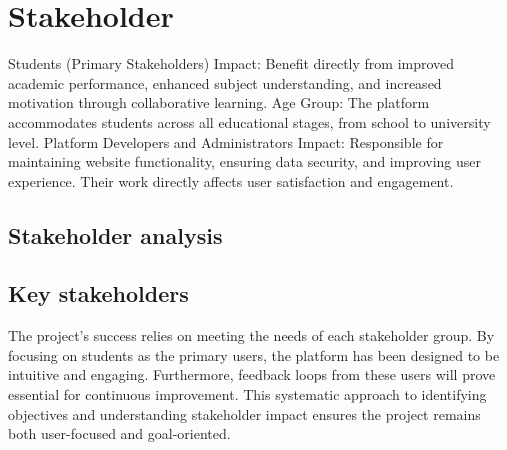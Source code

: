 \section{Stakeholder}
\label{sect:stakeholder}
\begin{length}
    Students (Primary Stakeholders)
        Impact: Benefit directly from improved academic performance, enhanced subject understanding, and increased motivation through collaborative learning.
        Age Group: The platform accommodates students across all educational stages, from school to university level.
    Platform Developers and Administrators
        Impact: Responsible for maintaining website functionality, ensuring data security, and improving user experience. Their work directly affects user satisfaction and engagement.
\end{length}

\subsection{Stakeholder analysis}
\subsection{Key stakeholders}
\begin{length}
    The project's success relies on meeting the needs of each stakeholder group. By focusing on students as the primary users, the platform has been designed to be intuitive and engaging. Furthermore, feedback loops from these users will prove essential for continuous improvement. This systematic approach to identifying objectives and understanding stakeholder impact ensures the project remains both user-focused and goal-oriented.
\end{length}
